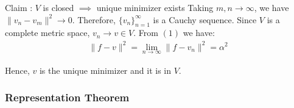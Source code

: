 \begin{proof*}
\begin{subproof}{Claim : $V$ is closed $\implies$ unique minimizer exists}
        \noindent Taking $m, n \to \infty$, we have $\|v_n-v_m\|^2\to 0$. Therefore, $\{v_n\}_{n=1}^\infty$ is a Cauchy sequence. Since $V$ is a complete metric space, $v_n \to v \in V$. From $(1)$ we have:
        \begin{align*}
            \|f - v\|^2 = \lim_{n\to\infty} \|f - v_n\|^2 = \alpha^2 
        \end{align*}

        \noindent Hence, $v$ is the unique minimizer and it is in $V$.
    \end{subproof}
\end{proof*}


\subsubsection{Representation Theorem}
